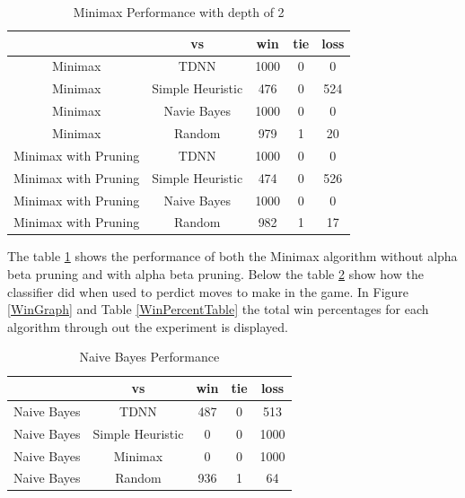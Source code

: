 \documentclass[12pt,letterpaper]{article}
\begin{document}
\begin{table}[h]
\begin{center}
\begin{tabular}{|c||c|c|c|c|}
\hline
& vs & win & tie & loss\\
\hline \hline
Minimax & TDNN & 1000 & 0 & 0\\
\hline 
Minimax & Simple Heuristic & 476 & 0 & 524\\
\hline 
Minimax & Navie Bayes & 1000 & 0 & 0\\
\hline 
Minimax & Random & 979 & 1 & 20\\
\hline 
Minimax with Pruning & TDNN & 1000 & 0 & 0\\
\hline 
Minimax with Pruning & Simple Heuristic & 474 & 0 & 526\\
\hline 
Minimax with Pruning & Naive Bayes & 1000 & 0 & 0\\
\hline 
Minimax with Pruning & Random & 982 & 1 & 17\\
\hline 
\end{tabular}
\end{center}
\caption{Minimax Performance with depth of 2}
\label{MinimaxTable}
\end{table}

The table \ref{MinimaxTable} shows the performance of both the Minimax algorithm without alpha beta pruning and with alpha beta pruning. Below the table \ref{NaiveBayesTable} show how the classifier did when used to perdict moves to make in the game. In Figure \ref{WinGraph} and Table \ref{WinPercentTable} the total win percentages for each algorithm through out the experiment is displayed.


\begin{table}[h]
\begin{center}
\begin{tabular}{|c||c|c|c|c|}
\hline
& vs & win & tie & loss\\
\hline \hline
Naive Bayes & TDNN & 487 & 0 & 513\\
\hline 
Naive Bayes & Simple Heuristic & 0 & 0 & 1000\\
\hline 
Naive Bayes & Minimax & 0 & 0 & 1000\\
\hline 
Naive Bayes & Random & 936 & 1 & 64\\
\hline 
\end{tabular}
\end{center}
\caption{Naive Bayes Performance}
\label{NaiveBayesTable}
\end{table}
\end{document}
